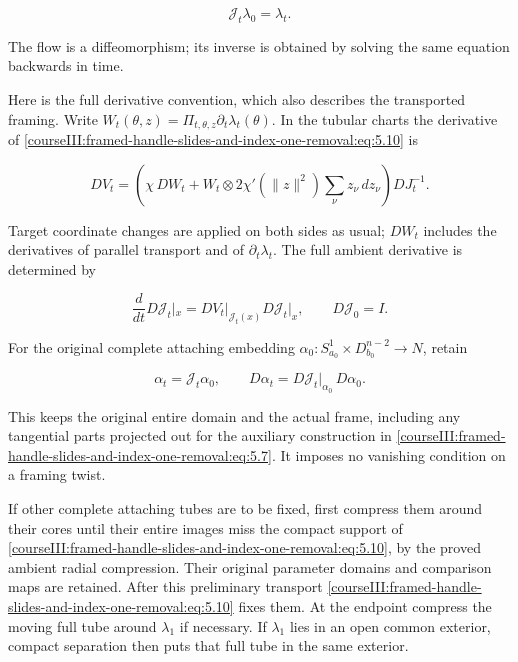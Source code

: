 \begin{equation}
\mathcal J_t\lambda_0=\lambda_t.
 \label{courseIII:framed-handle-slides-and-index-one-removal:eq:5.11}
\end{equation}

The flow is a diffeomorphism; its inverse is obtained by solving the same equation backwards in time.

Here is the full derivative convention, which also describes the transported framing. Write
\(W_t(\theta,z)=\Pi_{t,\theta,z}\partial_t\lambda_t(\theta)\).
In the tubular charts the derivative of \eqref{courseIII:framed-handle-slides-and-index-one-removal:eq:5.10} is

\begin{equation}
D V_t
  =\left(\chi\,D W_t+
       W_t\otimes 2\chi'(\|z\|^2)
                       \sum_\nu z_\nu\,dz_\nu\right)
       D J_t^{-1}.
 \label{courseIII:framed-handle-slides-and-index-one-removal:eq:5.12}
\end{equation}

Target coordinate changes are applied on both sides as usual; \(DW_t\) includes the derivatives of parallel transport and of \(\partial_t\lambda_t\). The full ambient derivative is determined by

\begin{equation}
\frac{d}{dt}D\mathcal J_t|_x
   =D V_t|_{\mathcal J_t(x)}D\mathcal J_t|_x,
 \qquad D\mathcal J_0=I.
 \label{courseIII:framed-handle-slides-and-index-one-removal:eq:5.13}
\end{equation}

For the original complete attaching embedding
\(\alpha_0:S^1_{a_0}\times D^{n-2}_{b_0}\to N\), retain

\begin{equation}
\alpha_t=\mathcal J_t\alpha_0,\qquad
 D\alpha_t=D\mathcal J_t|_{\alpha_0}\,D\alpha_0 .
 \label{courseIII:framed-handle-slides-and-index-one-removal:eq:5.14}
\end{equation}

This keeps the original entire domain and the actual frame, including any tangential parts projected out for the auxiliary construction in \eqref{courseIII:framed-handle-slides-and-index-one-removal:eq:5.7}. It imposes no vanishing condition on a framing twist.

If other complete attaching tubes are to be fixed, first compress them around their cores until their entire images miss the compact support of \eqref{courseIII:framed-handle-slides-and-index-one-removal:eq:5.10}, by the proved ambient radial compression. Their original parameter domains and comparison maps are retained. After this preliminary transport \eqref{courseIII:framed-handle-slides-and-index-one-removal:eq:5.10} fixes them. At the endpoint compress the moving full tube around \(\lambda_1\) if necessary. If \(\lambda_1\) lies in an open common exterior, compact separation then puts that full tube in the same exterior.

